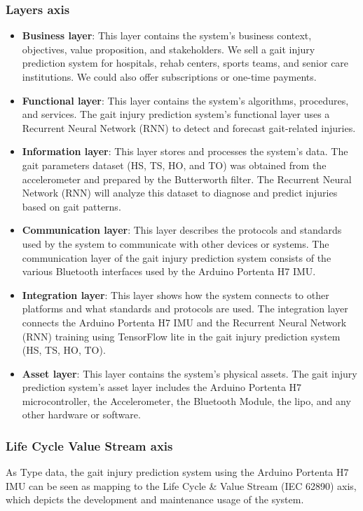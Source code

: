 \subsubsection{Layers axis}
\begin{itemize}
\item \textbf{Business layer}:
This layer contains the system's business context, objectives, value proposition, and stakeholders. We sell a gait injury prediction system for hospitals, rehab centers, sports teams, and senior care institutions. We could also offer subscriptions or one-time payments.

\item \textbf{Functional layer}: 
This layer contains the system's algorithms, procedures, and services. The gait injury prediction system's functional layer uses a Recurrent Neural Network (RNN) to detect and forecast gait-related injuries.

\item \textbf{Information layer}:
This layer stores and processes the system's data. The gait parameters dataset (HS, TS, HO, and TO) was obtained from the accelerometer and prepared by the Butterworth filter. The Recurrent Neural Network (RNN) will analyze this dataset to diagnose and predict injuries based on gait patterns.

\item \textbf{Communication layer}:
This layer describes the protocols and standards used by the system to communicate with other devices or systems. The communication layer of the gait injury prediction system consists of the various Bluetooth interfaces used by the Arduino Portenta H7 IMU.

\item \textbf{Integration layer}:
This layer shows how the system connects to other platforms and what standards and protocols are used. The integration layer connects the Arduino Portenta H7 IMU and the Recurrent Neural Network (RNN) training using TensorFlow lite in the gait injury prediction system (HS, TS, HO, TO).

\item \textbf{Asset layer}:
This layer contains the system's physical assets. The gait injury prediction system's asset layer includes the Arduino Portenta H7 microcontroller, the Accelerometer, the Bluetooth Module, the \ac{lipo}, and any other hardware or software.
\end{itemize}

\subsubsection{Life Cycle Value Stream axis}
As Type data, the gait injury prediction system using the Arduino Portenta H7 IMU can be seen as mapping to the Life Cycle \& Value Stream (IEC 62890) axis, which depicts the development and maintenance usage of the system.

